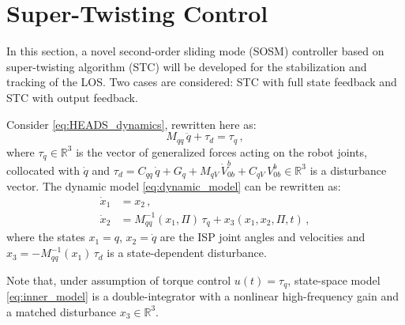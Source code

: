 \section{Super-Twisting Control}

In this section, a novel second-order sliding mode (SOSM) controller based on super-twisting algorithm (STC) will be developed for the stabilization and tracking of the LOS.
%
Two cases are considered: STC with full state feedback and STC with output feedback.

Consider \eqref{eq:HEADS_dynamics}, rewritten here as:
%
\begin{equation}
M_{qq} \, \ddot{q} + \tau_d = \tau_q \,,
\label{eq:dynamic_model}
\end{equation}
%
where $\tau_q \in \mathbb{R}^{3}$ is the vector of generalized forces acting on the robot joints, collocated with $\dot{q}$ and $\tau_d = C_{qq} \, \dot{q} + G_{q} + M_{qV} \, \dot{V}^{b}_{0b} + C_{qV} \, V^{b}_{0b} \in \mathbb{R}^{3}$ is a disturbance vector.
%
%
The dynamic model \eqref{eq:dynamic_model} can be rewritten as:
%
\begin{align}
\dot{x}_1 &= x_2 \,, \nonumber \\
\dot{x}_2 &= M^{-1}_{qq}(x_1,\Pi)\,\tau_q + x_3(x_1,x_2,\Pi,t) \,,
\label{eq:inner_model}
\end{align}
%
where the states $x_1 = q$, $x_2 = \dot{q}$ are the ISP joint angles and velocities and $x_3 = -M^{-1}_{qq}(x_1) \,\tau_d$ is a state-dependent disturbance.

\begin{remark}
Note that, under assumption of torque control $u(t) = \tau_q$, state-space model \eqref{eq:inner_model} is a double-integrator with a nonlinear high-frequency gain and a matched disturbance $x_3 \in \mathbb{R}^{3}$.
\end{remark}

